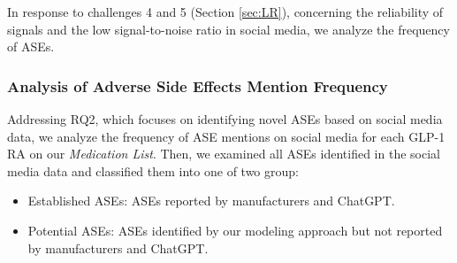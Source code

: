 \documentclass[referee,bst/sn-basic]{sn-jnl}%
\theoremstyle{thmstyletwo}%
\theoremstyle{thmstylethree}%
\begin{document}
In response to challenges 4 and 5 (Section \ref{sec:LR}), concerning the reliability of signals and the low signal-to-noise ratio in social media, we analyze the frequency of ASEs.

\subsubsection{Analysis of Adverse Side Effects Mention Frequency}
\label{sec:modelval}
Addressing RQ2, which focuses on identifying novel ASEs based on social media data, we analyze the frequency of ASE mentions on social media for each GLP-1 RA on our \textit{Medication List}.
Then, we examined all ASEs identified in the social media data and classified them into one of two group:
\begin{itemize}
    \item 
    Established ASEs: ASEs reported by manufacturers and ChatGPT.

    \item 
    Potential ASEs: ASEs identified by our modeling approach but not reported by manufacturers and ChatGPT. 
\end{itemize}






\end{document}
